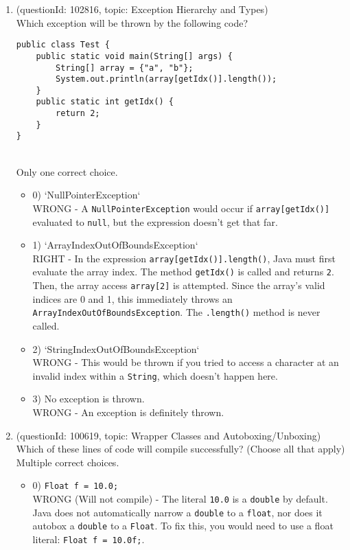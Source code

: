 \documentclass[12pt]{article}
\begin{document}
\begin{enumerate}[label=(\arabic*)]
\begin{itemize}
\end{itemize}
\item (questionId: 102816, topic: Exception Hierarchy and Types) \\ 
Which exception will be thrown by the following code?
\begin{verbatim}
public class Test {
    public static void main(String[] args) {
        String[] array = {"a", "b"};
        System.out.println(array[getIdx()].length());
    }
    public static int getIdx() {
        return 2;
    }
}
\end{verbatim}
\\ \noindent Only one correct choice. 
\begin{itemize}
\item 0) `NullPointerException`
 \\ 
WRONG - A \verb|NullPointerException| would occur if \verb|array[getIdx()]| evaluated to \verb|null|, but the expression doesn't get that far.

\item 1) `ArrayIndexOutOfBoundsException`
 \\ 
RIGHT - In the expression \verb|array[getIdx()].length()|, Java must first evaluate the array index. The method \verb|getIdx()| is called and returns \verb|2|. Then, the array access \verb|array[2]| is attempted. Since the array's valid indices are 0 and 1, this immediately throws an \verb|ArrayIndexOutOfBoundsException|. The \verb|.length()| method is never called.

\item 2) `StringIndexOutOfBoundsException`
 \\ 
WRONG - This would be thrown if you tried to access a character at an invalid index within a \verb|String|, which doesn't happen here.

\item 3) No exception is thrown.
 \\ 
WRONG - An exception is definitely thrown.

\end{itemize}
\item (questionId: 100619, topic: Wrapper Classes and Autoboxing/Unboxing) \\ 
Which of these lines of code will compile successfully? (Choose all that apply)
\\ \noindent Multiple correct choices. 
\begin{itemize}
\item 0) \verb|Float f = 10.0;|
 \\ 
WRONG (Will not compile) - The literal \verb|10.0| is a \verb|double| by default. Java does not automatically narrow a \verb|double| to a \verb|float|, nor does it autobox a \verb|double| to a \verb|Float|. To fix this, you would need to use a float literal: \verb|Float f = 10.0f;|.


\end{itemize}
\end{enumerate}
\end{document}
